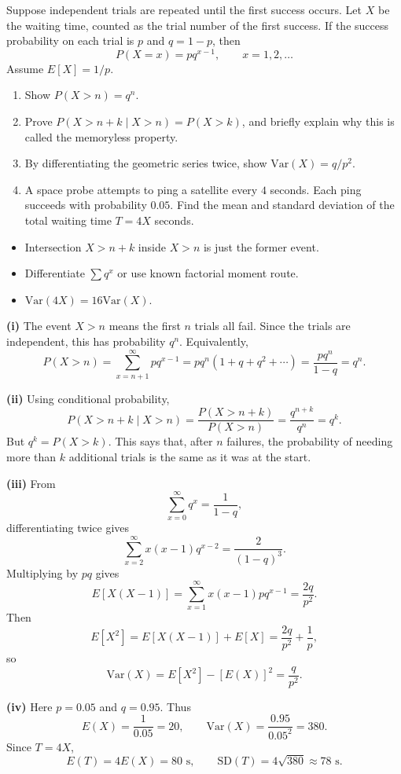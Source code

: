 \begin{problem}
Suppose independent trials are repeated until the first success occurs. Let $X$ be the waiting time, counted as the trial number of the first success. If the success probability on each trial is $p$ and $q=1-p$, then
\[
P(X=x)=pq^{x-1},\qquad x=1,2,\ldots
\]
Assume $E[X]=1/p$.
\begin{enumerate}[label=\textbf{(\roman*)}]
\item Show $P(X>n)=q^{n}$.
\item Prove $P(X>n+k\mid X>n)=P(X>k)$, and briefly explain why this is called the memoryless property.
\item By differentiating the geometric series twice, show $\mathrm{Var}(X)=q/p^{2}$.
\item A space probe attempts to ping a satellite every $4$ seconds. Each ping succeeds with probability $0{.}05$. Find the mean and standard deviation of the total waiting time $T=4X$ seconds.
\end{enumerate}


\end{problem}

\begin{hint}
\begin{itemize}[leftmargin=*]
\item Intersection $X>n{+}k$ inside $X>n$ is just the former event.
\item Differentiate $\sum q^{x}$ or use known factorial moment route.
\item $\mathrm{Var}(4X)=16\mathrm{Var}(X)$.
\end{itemize}
\end{hint}

\begin{solution}
\textbf{(i)} The event $X>n$ means the first $n$ trials all fail. Since the trials are independent, this has probability $q^n$. Equivalently,
\[
P(X>n)=\sum_{x=n+1}^{\infty}pq^{x-1}
=pq^n(1+q+q^2+\cdots)=\frac{pq^n}{1-q}=q^n.
\]

\textbf{(ii)} Using conditional probability,
\[
P(X>n+k\mid X>n)=\frac{P(X>n+k)}{P(X>n)}
=\frac{q^{n+k}}{q^n}=q^k.
\]
But $q^k=P(X>k)$. This says that, after $n$ failures, the probability of needing more than $k$ additional trials is the same as it was at the start.

\textbf{(iii)} From
\[
\sum_{x=0}^{\infty}q^x=\frac{1}{1-q},
\]
differentiating twice gives
\[
\sum_{x=2}^{\infty}x(x-1)q^{x-2}=\frac{2}{(1-q)^3}.
\]
Multiplying by $pq$ gives
\[
E[X(X-1)]=\sum_{x=1}^{\infty}x(x-1)pq^{x-1}=\frac{2q}{p^2}.
\]
Then
\[
E[X^2]=E[X(X-1)]+E[X]=\frac{2q}{p^2}+\frac1p,
\]
so
\[
\mathrm{Var}(X)=E[X^2]-[E(X)]^2=\frac{q}{p^2}.
\]

\textbf{(iv)} Here $p=0{.}05$ and $q=0{.}95$. Thus
\[
E(X)=\frac1{0{.}05}=20,\qquad
\mathrm{Var}(X)=\frac{0{.}95}{0{.}05^2}=380.
\]
Since $T=4X$,
\[
E(T)=4E(X)=80\text{ s},\qquad
\mathrm{SD}(T)=4\sqrt{380}\approx \boxed{78\text{ s}}.
\]
\end{solution}

